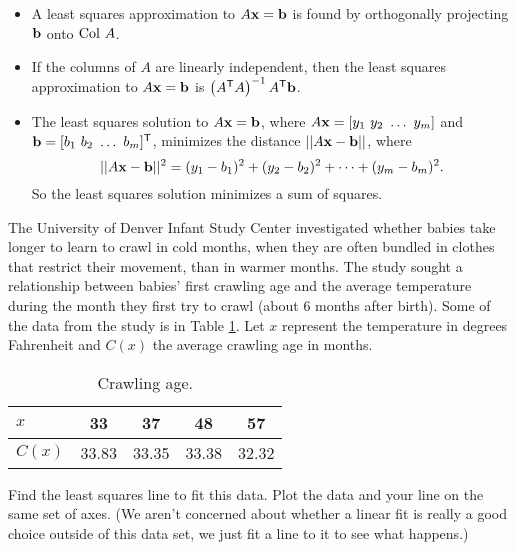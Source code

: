 \label{sec:ls_summ}
\begin{itemize}
\item A least squares approximation to $A \mathbf{x} = \mathbf{b}$ is found by orthogonally projecting $\mathbf{b}$ onto $\text{Col } A$. 
\item If the columns of $A$ are linearly independent, then the least squares approximation to $A \mathbf{x} = \mathbf{b}$ is $\left(A^{\mathsf{T}}A\right)^{-1}A^{\mathsf{T}} \mathbf{b}$. 
\item The least squares solution to $A \mathbf{x} = \mathbf{b}$, where $A\mathbf{x} = [y_1 \ y_2 \ \ldots \ y_m]$ and $\mathbf{b} = [b_1 \ b_2 \ \ldots \ b_ m]^{\mathsf{T}}$, minimizes the distance $||A\mathbf{x} - \mathbf{b}||$, where 
\begin{equation*}
||A\mathbf{x} - \mathbf{b}||^2 = (y_1-b_1)^2 + (y_2-b_2)^2 + \cdots + (y_m-b_m)^2. 
\end{equation*}
So the least squares solution minimizes a sum of squares. 
 
\end{itemize}


\label{sec:ls_exer}

\be
\item The University of Denver Infant Study Center investigated whether babies take longer to learn to crawl in cold months, when they are often bundled in clothes that restrict their movement, than in warmer months. The study sought a relationship between babies' first crawling age and the average temperature during the month they first try to crawl (about 6 months after birth). Some of the data from the study is in Table \ref{T:7_d_infants}. Let $x$ represent the temperature in degrees Fahrenheit and $C(x)$ the average crawling age in months. 

\begin{table}[ht]
\begin{center}
\begin{tabular}{|l||c|c|c|c|} \hline
$x$		&33		&37		&48		&57 \\ \hline
$C(x)$	&33.83	&33.35	&33.38	&32.32 \\ \hline
\end{tabular}
\end{center}
\caption{Crawling age.}
\label{T:7_d_infants}
\end{table}
	\ba
	\item Find the least squares line to fit this data. Plot the data and your line on the same set of axes. (We aren't concerned about whether a linear fit is really a good choice outside of this data set, we just fit a line to it to see what happens.)
	
